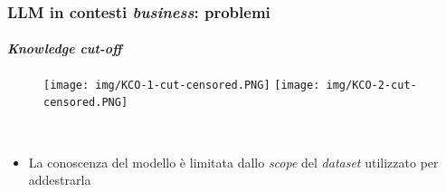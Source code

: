 %
\begin{frame}[t] \frametitle{LLM in contesti \emph{business}: problemi}
\framesubtitle{\emph{Knowledge cut-off}}
{\scriptsize
{}
    \begin{minipage}[t]{\textwidth}
        \vspace*{-.5cm}
        \begin{figure}
            \centering
            \texttt{[image: img/KCO-1-cut-censored.PNG]}
            \texttt{[image: img/KCO-2-cut-censored.PNG]}
        \end{figure}
    \end{minipage}
    \\\vspace*{.3cm}
    \begin{itemize}[leftmargin=10pt,align=right]
        \item[\alert{\faArrowCircleRight}] La conoscenza del modello è limitata dallo \emph{scope} del \emph{dataset} utilizzato per addestrarla
    \end{itemize}
}
\end{frame}
%
